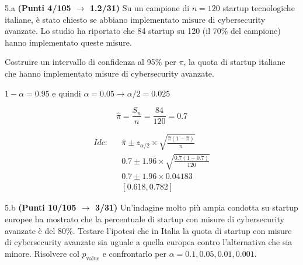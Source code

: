 \documentclass[
  11pt,
]{book}
\theoremstyle{mytheoremstyle}
\theoremstyle{mydefstyle}
\newenvironment{sol}
  {
  \begin{tcolorbox}[enhanced,breakable,arc=0.1mm,boxrule=1pt,colback=white,colframe=iblue,
  title=\bf \fontfamily{lmss}\selectfont \hspace{.5 cm} Soluzione,drop fuzzy shadow]

}{
\end{tcolorbox}
  }
\begin{document}
5.a \textbf{(Punti 4/105 \(\rightarrow\) 1.2/31)} Su un campione di \(n = 120\) startup tecnologiche italiane, è stato chiesto se abbiano implementato misure di cybersecurity avanzate. Lo studio ha riportato che 84 startup su 120 (il 70\% del campione) hanno implementato queste misure.

Costruire un intervallo di confidenza al 95\% per \(\pi\), la quota di startup italiane che hanno implementato misure di cybersecurity avanzate.

\begin{sol}
\(1-\alpha =0.95\) e quindi \(\alpha=0.05\rightarrow \alpha/2=0.025\)

\[
  \hat\pi = \frac{S_n}n = \frac{ 84 }{ 120 }= 0.7 
\]

\begin{eqnarray*}
  Idc: & &  \hat\pi \pm  z_{\alpha/2} \times \sqrt{\frac{\hat\pi(1-\hat\pi)}{n}} \\
     & &  0.7 \pm  1.96 \times \sqrt{\frac{ 0.7 (1- 0.7 )}{ 120 }} \\
     & &  0.7 \pm  1.96 \times  0.04183 \\
     & & [ 0.618 ,  0.782 ]
\end{eqnarray*}

\end{sol}

5.b \textbf{(Punti 10/105 \(\rightarrow\) 3/31)} Un'indagine molto più ampia condotta su startup europee ha mostrato che la percentuale di startup con misure di cybersecurity avanzate è del 80\%. Testare l'ipotesi che in Italia la quota di startup con misure di cybersecurity avanzate sia uguale a quella europea contro l'alternativa che sia minore. Risolvere col \(p_\text{value}\) e confrontarlo per \(\alpha=0.1,0.05,0.01,0.001\).
\end{document}
